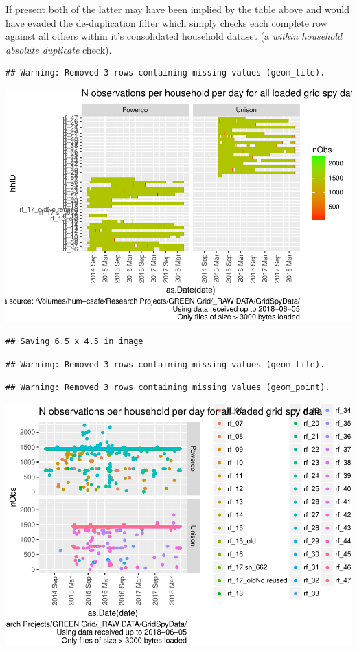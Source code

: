 \documentclass[]{article}
\begin{document}
If present both of the latter may have been implied by the table above
and would have evaded the de-duplication filter which simply checks each
complete row against all others within it's consolidated household
dataset (a \emph{within household absolute duplicate} check).

\begin{verbatim}
## Warning: Removed 3 rows containing missing values (geom_tile).
\end{verbatim}

\includegraphics{processGridSpy1minData_files/figure-latex/loadedFilesObsPlots-1.pdf}

\begin{verbatim}
## Saving 6.5 x 4.5 in image
\end{verbatim}

\begin{verbatim}
## Warning: Removed 3 rows containing missing values (geom_tile).
\end{verbatim}

\begin{verbatim}
## Warning: Removed 3 rows containing missing values (geom_point).
\end{verbatim}

\includegraphics{processGridSpy1minData_files/figure-latex/plot n obs per hh id as dots-1.pdf}
\end{document}
